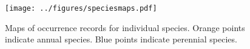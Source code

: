 \documentclass[man,floatsintext]{apa6}
\theoremstyle{definition}
\theoremstyle{definition}
\theoremstyle{definition}
\theoremstyle{remark}
\begin{document}
\begin{figure}
\centering
\texttt{[image: ../figures/speciesmaps.pdf]}
\caption{\label{fig:speciesmaps}Maps of occurrence records for individual species.
Orange points indicate annual species. Blue points indicate perennial
species.}
\end{figure}
\end{document}
